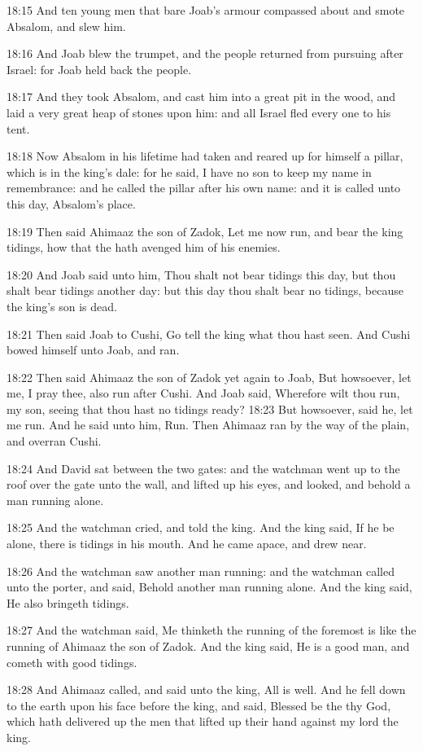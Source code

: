 18:15 And ten young men that bare Joab's armour compassed about and smote Absalom, and slew him.

18:16 And Joab blew the trumpet, and the people returned from pursuing after Israel: for Joab held back the people.

18:17 And they took Absalom, and cast him into a great pit in the wood, and laid a very great heap of stones upon him: and all Israel fled every one to his tent.

18:18 Now Absalom in his lifetime had taken and reared up for himself a pillar, which is in the king's dale: for he said, I have no son to keep my name in remembrance: and he called the pillar after his own name: and it is called unto this day, Absalom's place.

18:19 Then said Ahimaaz the son of Zadok, Let me now run, and bear the king tidings, how that the \LORD hath avenged him of his enemies.

18:20 And Joab said unto him, Thou shalt not bear tidings this day, but thou shalt bear tidings another day: but this day thou shalt bear no tidings, because the king's son is dead.

18:21 Then said Joab to Cushi, Go tell the king what thou hast seen.  And Cushi bowed himself unto Joab, and ran.

18:22 Then said Ahimaaz the son of Zadok yet again to Joab, But howsoever, let me, I pray thee, also run after Cushi. And Joab said, Wherefore wilt thou run, my son, seeing that thou hast no tidings ready?  18:23 But howsoever, said he, let me run. And he said unto him, Run. Then Ahimaaz ran by the way of the plain, and overran Cushi.

18:24 And David sat between the two gates: and the watchman went up to the roof over the gate unto the wall, and lifted up his eyes, and looked, and behold a man running alone.

18:25 And the watchman cried, and told the king. And the king said, If he be alone, there is tidings in his mouth. And he came apace, and drew near.

18:26 And the watchman saw another man running: and the watchman called unto the porter, and said, Behold another man running alone.  And the king said, He also bringeth tidings.

18:27 And the watchman said, Me thinketh the running of the foremost is like the running of Ahimaaz the son of Zadok. And the king said, He is a good man, and cometh with good tidings.

18:28 And Ahimaaz called, and said unto the king, All is well. And he fell down to the earth upon his face before the king, and said, Blessed be the \LORD thy God, which hath delivered up the men that lifted up their hand against my lord the king.

